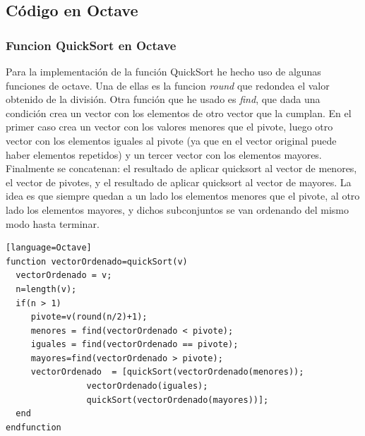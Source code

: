 \documentclass[a4,12pt]{article}
\begin{document}
\subsection{Código en Octave}
\subsubsection{Funcion QuickSort en Octave}
Para la implementación de la función QuickSort he hecho uso de algunas funciones de octave. Una de ellas es la funcion \emph{round} que redondea el valor obtenido de la división. Otra función que he usado es \emph{find}, que dada una condición crea un vector con los elementos de otro vector que la cumplan. En el primer caso crea un vector con los valores menores que el pivote, luego otro vector con los elementos iguales al pivote (ya que en el vector original puede haber elementos repetidos) y un tercer vector con los elementos mayores. Finalmente se concatenan: el resultado de aplicar quicksort al vector de menores, el vector de pivotes, y el resultado de aplicar quicksort al vector de mayores. La idea es que siempre quedan a un lado los elementos menores que el pivote, al otro lado los elementos mayores, y dichos subconjuntos se van ordenando del mismo modo hasta terminar.
\bigskip %
\lstset{language=Octave}
\begin{lstlisting}[frame=single][language=Octave]
function vectorOrdenado=quickSort(v)     
  vectorOrdenado = v;
  n=length(v);
  if(n > 1)          
     pivote=v(round(n/2)+1);             
     menores = find(vectorOrdenado < pivote); 
     iguales = find(vectorOrdenado == pivote);
     mayores=find(vectorOrdenado > pivote);
     vectorOrdenado  = [quickSort(vectorOrdenado(menores));
     			vectorOrdenado(iguales); 
     			quickSort(vectorOrdenado(mayores))];
  end
endfunction
\end{lstlisting}
\end{document}
